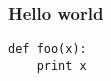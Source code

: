 \documentclass{beamer}
\begin{document}
\begin{frame}[fragile]
  \frametitle{Hello world}
\begin{lstlisting}[language=python_new]
def foo(x):
    print x
\end{lstlisting}
\end{frame}
\end{document}
